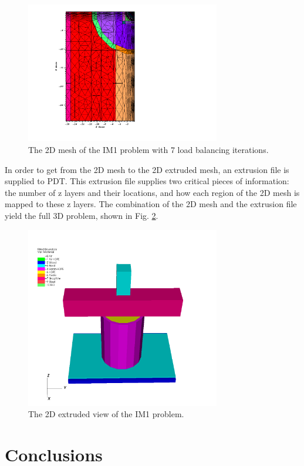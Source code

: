\documentclass{anstrans}
\begin{document}
\begin{figure}
\centering
\includegraphics[width=85mm]{figures/IM1_post_iterations0000.png}
\caption{The 2D mesh of the IM1 problem with 7 load balancing iterations.}
\label{IM12D}
\end{figure}
In order to get from the 2D mesh to the 2D extruded mesh, an extrusion file is supplied to PDT. This extrusion file supplies two critical pieces of information: the number of z layers and their locations, and how each region of the 2D mesh is mapped to these z layers. The combination of the 2D mesh and the extrusion file yield the full 3D problem, shown in Fig. \ref{IM13D}.

\begin{figure}
\centering
\includegraphics[width=85mm,trim= 0cm 0cm 0cm 3cm, clip]{figures/IM1_3D.png}
\caption{The 2D extruded view of the IM1 problem.}
\label{IM13D}
\end{figure}


\section{Conclusions}
\end{document}
